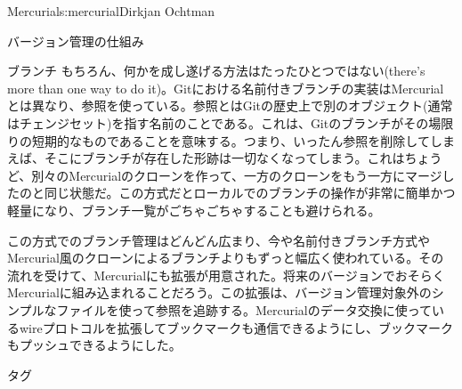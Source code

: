 \begin{aosachapter}{Mercurial}{s:mercurial}{Dirkjan Ochtman}
\begin{aosasect1}{バージョン管理の仕組み}
\begin{aosasect2}{ブランチ}
もちろん、何かを成し遂げる方法はたったひとつではない(there's more than one way to do it)。Gitにおける名前付きブランチの実装はMercurialとは異なり、参照を使っている。参照とはGitの歴史上で別のオブジェクト(通常はチェンジセット)を指す名前のことである。これは、Gitのブランチがその場限りの短期的なものであることを意味する。つまり、いったん参照を削除してしまえば、そこにブランチが存在した形跡は一切なくなってしまう。これはちょうど、別々のMercurialのクローンを作って、一方のクローンをもう一方にマージしたのと同じ状態だ。この方式だとローカルでのブランチの操作が非常に簡単かつ軽量になり、ブランチ一覧がごちゃごちゃすることも避けられる。

この方式でのブランチ管理はどんどん広まり、今や名前付きブランチ方式やMercurial風のクローンによるブランチよりもずっと幅広く使われている。その流れを受けて、Mercurialにも拡張が用意された。将来のバージョンでおそらくMercurialに組み込まれることだろう。この拡張は、バージョン管理対象外のシンプルなファイルを使って参照を追跡する。Mercurialのデータ交換に使っているwireプロトコルを拡張してブックマークも通信できるようにし、ブックマークもプッシュできるようにした。

\end{aosasect2}

\begin{aosasect2}{タグ}


\end{aosasect2}
\end{aosasect1}
\end{aosachapter}

